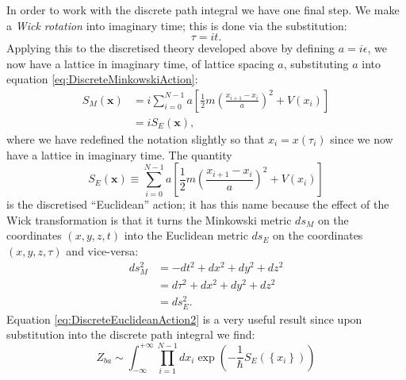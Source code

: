 \documentclass[12pt]{article}
\begin{document}
        In order to work with the discrete path integral we have one final step. We make a \textit{Wick rotation} into imaginary time; this is done via the substitution:
        \begin{equation}
            \label{eq:WickRotation}
            \tau = it.
        \end{equation}
        Applying this to the discretised theory developed above by defining $a=i\epsilon$, we now have a lattice in imaginary time, of lattice spacing $a$, substituting $a$ into equation \ref{eq:DiscreteMinkowskiAction}:
        \begin{align}
            \label{eq:DiscreteEuclideanAction1}
            S_M\left(\bm{x}\right) & = i\sum_{i=0}^{N-1} a \left[\frac{1}{2}m\left(\frac{x_{i+1}-x_{i}}{a}\right)^2 + V(x_i)\right] \\
            \label{eq:DiscreteEuclideanAction2} & = iS_E\left(\bm{x}\right),
        \end{align}
        where we have redefined the notation slightly so that $x_i=x\left(\tau_i\right)$ since we now have a lattice in imaginary time.
        The quantity
        \begin{equation}
            \label{eq:DiscreteEuclideanAction}
            S_{E}\left(\bm{x}\right) \equiv \sum_{i=0}^{N-1} a \left[\frac{1}{2}m\left(\frac{x_{i+1}-x_{i}}{a}\right)^2 + V(x_i)\right]
        \end{equation}
        is the discretised ``Euclidean'' action; it has this name because the effect of the Wick transformation is that it turns the Minkowski metric $ds_{M}$ on the coordinates $\left(x,y,z,t\right)$ into the Euclidean metric $ds_{E}$ on the coordinates $\left(x,y,z,\tau\right)$ and vice-versa:
        \begin{align}
            \label{eq:MinkowskiMetric} ds_{M}^{2} & = -dt^2 + dx^2 + dy^2 + dz^2 \\
            \label{eq:MetricTransform}            & = d\tau^2 + dx^2 + dy^2 + dz^2 \\
            \label{eq:EuclideanMetric}            & = ds_{E}^{2}.
        \end{align}
        Equation \ref{eq:DiscreteEuclideanAction2} is a very useful result since upon substitution into the discrete path integral we find:
        \begin{equation}
            \label{eq:DiscreteEuclideanPathIntegral}
            Z_{ba} \sim \int^{+\infty}_{-\infty}\prod_{i=1}^{N-1}dx_i \exp{\left(-\frac{1}{\hbar}S_{E}\left(\left\{x_i\right\}\right)\right)}
        \end{equation}
\end{document}
